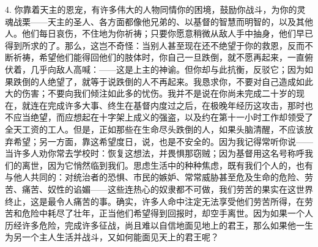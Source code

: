 4. 你靠着天主的恩宠，有许多伟大的人物同情你的困境，鼓励你战斗，为你的灵魂战栗——天主的圣人、各方面都像他兄弟的、以基督的智慧而明智的，以及其他人。他们每日哀伤，不住地为你祈祷；只要你愿意稍微从敌人手中抽身，他们早已得到所求的了。那么，这岂不奇怪：当别人甚至现在还不绝望于你的救恩，反而不断祈祷，希望他们能得回他们的肢体时，你自己一旦跌倒，就不愿再起来，一直俯伏着，几乎向敌人高喊：——这是上主的神谕。但你却与此抗衡，反驳它；因为如果跌倒的人绝望了，就等于说跌倒的人不再起来。我恳求你，不要对自己造成如此大的伤害；不要向我们倾注如此多的忧伤。我并不是说在你尚未完成二十岁的现在，就连在完成许多大事、终生在基督内度过之后，在极晚年经历这攻击，那时也不应当绝望，而应想起在十字架上成义的强盗，以及约在第十一小时工作却领受了全天工资的工人。但是，正如那些在生命尽头跌倒的人，如果头脑清醒，不应该放弃希望；另一方面，靠这希望度日，说，也是不安全的。因为我记得常听你说——当许多人劝你常去学校时：恢复这想法，并畏惧那窃贼；因为基督用这名号称呼我们的离世，因为它悄然临到我们。思虑生活中的种种焦虑，既有我们个人的，也有与他人共同的：对统治者的恐惧、市民的嫉妒、常常威胁甚至危及生命的危险、劳苦、痛苦、奴性的谄媚——这些连热心的奴隶都不可做，我们劳苦的果实在这世界终止，这是最令人痛苦的事。确实，许多人命中注定无法享受他们劳苦所得，在劳苦和危险中耗尽了壮年，正当他们希望得到回报时，却空手离世。因为如果一个人历经许多危险，完成许多征战，尚且难以自信地面见地上的君王，那么如果他一生为另一个主人生活并战斗，又如何能面见天上的君王呢？\par

